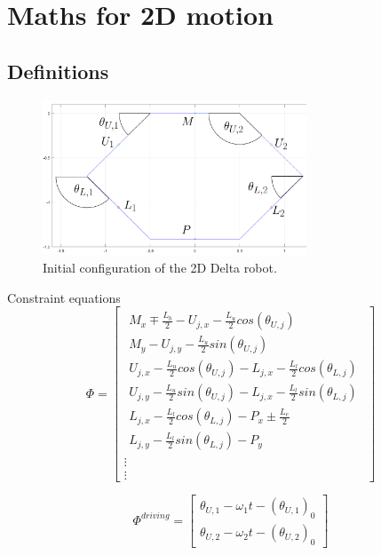 \section{Maths for 2D motion}
\subsection{Definitions}
\begin{figure}[h!]
	\centering
	\includegraphics[width=0.7\textwidth]{figures/Initial_2D.png}                                                              
	\caption[Initial configuration of the 2D Delta robot]{Initial configuration of the 2D Delta robot.}
	\label{fig:initia2D}
\end{figure}

Constraint equations
\begin{equation}
    \Phi=
    \begin{bmatrix}
    \begin{array}{l} %
    M_x\mp\frac{L_b}{2}-U_{j,x}-\frac{L_u}{2} cos(\theta_{U,j}) \\
    M_y-U_{j,y}-\frac{L_u}{2} sin(\theta_{U,j})\\
    U_{j,x}-\frac{L_u}{2}cos(\theta_{U,j})-L_{j,x}-\frac{L_l}{2}cos(\theta_{L,j}) \\
    U_{j,y}-\frac{L_u}{2}sin(\theta_{U,j})-L_{j,x}-\frac{L_l}{2}sin(\theta_{L,j})\\
    L_{j,x}-\frac{L_l}{2}cos(\theta_{L,j})-P_x \pm \frac{L_e}{2} \\
    L_{j,y}-\frac{L_l}{2}sin(\theta_{L,j})-P_y%
    \end{array}\\
    \vdots \\
    \vdots
    \end{bmatrix}
\end{equation}

\begin{equation}
    \Phi^{driving}=
    \begin{bmatrix}
    \theta_{U,1} - \omega_1 t - (\theta_{U,1})_0\\
    \theta_{U,2} - \omega_2 t - (\theta_{U,2})_0
    \end{bmatrix}
\end{equation}

